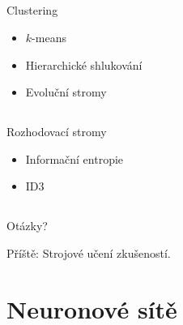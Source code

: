 \documentclass{beamer}
\begin{document}
\subsection{}
\begin{frame}{Clustering}
\begin{itemize}
\item $k$-means
\item Hierarchické shlukování
\item Evoluční stromy
\end{itemize}
\end{frame}

\subsection{}
\begin{frame}{Rozhodovací stromy}
\begin{itemize}
\item Informační entropie
\item ID3
\end{itemize}
\end{frame}

\subsection{}
\begin{frame}{Otázky?}
\begin{center}
Příště: Strojové učení zkušeností.
\end{center}
\end{frame}

\section{Neuronové sítě}
\end{document}
